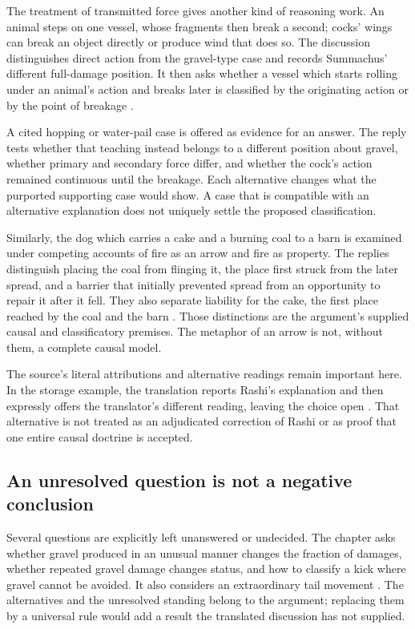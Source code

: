The treatment of transmitted force gives another kind of
reasoning work. An animal steps on one vessel, whose fragments
then break a second; cocks' wings can break an object directly
or produce wind that does so. The discussion distinguishes
direct action from the gravel-type case and records Summachus'
different full-damage position. It then asks whether a vessel
which starts rolling under an animal's action and breaks later
is classified by the originating action or by the point of
breakage
\parencite[pp.~30--33]{RodkinsonBabaKamaCopyright1900}.

A cited hopping or water-pail case is offered as evidence for
an answer. The reply tests whether that teaching instead belongs
to a different position about gravel, whether primary and
secondary force differ, and whether the cock's action remained
continuous until the breakage. Each alternative changes what
the purported supporting case would show. A case that is
compatible with an alternative explanation does not uniquely
settle the proposed classification.

Similarly, the dog which carries a cake and a burning coal
to a barn is examined under competing accounts of fire as
an arrow and fire as property. The replies distinguish placing
the coal from flinging it, the place first struck from the
later spread, and a barrier that initially prevented spread
from an opportunity to repair it after it fell. They also
separate liability for the cake, the first place reached by
the coal and the barn
\parencite[pp.~43--46]{RodkinsonBabaKamaCopyright1900}.
Those distinctions are the argument's supplied causal and
classificatory premises. The metaphor of an arrow is not,
without them, a complete causal model.

The source's literal attributions and alternative readings
remain important here. In the storage example, the translation
reports Rashi's explanation and then expressly offers the
translator's different reading, leaving the choice open
\parencite[pp.~41--42]{RodkinsonBabaKamaCopyright1900}.
That alternative is not treated as an adjudicated correction
of Rashi or as proof that one entire causal doctrine is accepted.

\subsection{An unresolved question is not a negative conclusion}
\label{sec:p18-talmudic-open-questions}

Several questions are explicitly left unanswered or undecided.
The chapter asks whether gravel produced in an unusual manner
changes the fraction of damages, whether repeated gravel damage
changes status, and how to classify a kick where gravel cannot
be avoided. It also considers an extraordinary tail movement
\parencite[pp.~35--36]{RodkinsonBabaKamaCopyright1900}.
The alternatives and the unresolved standing belong to the
argument; replacing them by a universal rule would add a result
the translated discussion has not supplied.

